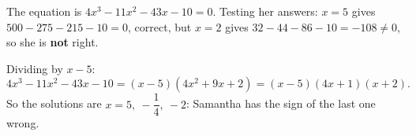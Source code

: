 The equation is $4x^3-11x^2-43x-10=0$. Testing her answers: $x=5$ gives $500-275-215-10=0$, correct, but $x=2$ gives $32-44-86-10=-108\ne0$, so she is \textbf{not} right.

Dividing by $x-5$:
\[4x^3-11x^2-43x-10=(x-5)\left(4x^2+9x+2\right)=(x-5)(4x+1)(x+2).\]
So the solutions are $\boxed{x=5,\ -\dfrac14,\ -2}$: Samantha has the sign of the last one wrong.
